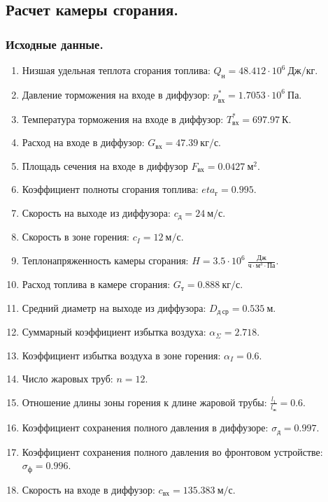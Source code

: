 \documentclass[a4paper,12pt]{article}
\begin{document}
    \subsection{Расчет камеры сгорания.}

    \subsubsection{Исходные данные.}
%    
    \begin{enumerate}
        \item Низшая удельная теплота сгорания топлива: $ Q_н = 48.412 \cdot 10^6\ Дж/кг $.
        \item Давление торможения на входе в диффузор: $ p_{вх}^* = 1.7053 \cdot 10^6\  Па$.
        \item Температура торможения на входе в диффузор: $ T_{вх}^* = 697.97\ К $.
        \item Расход на входе в диффузор: $G_{вх} = 47.39\ кг/с$.
        \item Площадь сечения на входе в диффузор $ F_{вх} = 0.0427\ м^2 $.
        \item Коэффициент полноты сгорания топлива: $eta_{г} = 0.995$.
        \item Скорость на выходе из диффузора: $c_{д} = 24\ м/с$.
        \item Скорость в зоне горения: $c_I = 12\ м/с$.
        \item Теплонапряженность камеры сгорания: $H = 3.5 \cdot10^6\ \frac{Дж}{ч \cdot м^3 \cdot Па}$.
        \item Расход топлива в камере сгорания: $G_т = 0.888\ кг/с$.
        \item Средний диаметр на выходе из диффузора: $D_{д\ ср} = 0.535\ м$.
        \item Суммарный коэффициент избытка воздуха: $\alpha_{\Sigma} = 2.718$.
        \item Коэффициент избытка воздуха в зоне горения: $\alpha_I = 0.6$.
        \item Число жаровых труб: $n = 12$.
        \item Отношение длины зоны горения к длине жаровой трубы: $\frac{l_1}{l_ж} = 0.6$.
        \item Коэффициент сохранения полного давления в диффузоре: $\sigma_д = 0.997$.
        \item Коэффициент сохранения полного давления во фронтовом устройстве: $\sigma_ф = 0.996$.
        \item Скорость на входе в диффузор: $c_{вх} = 135.383\ м/с$.
    \end{enumerate}
    
\end{document}
